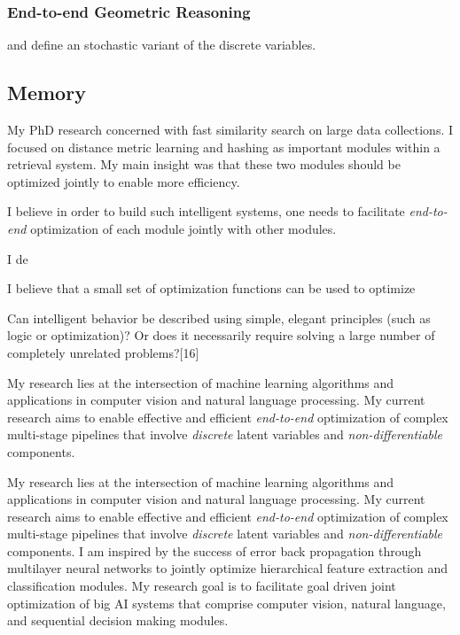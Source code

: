\documentclass[a4paper, 10pt]{article}
\begin{document}
\subsubsection*{End-to-end Geometric Reasoning}


and define an stochastic variant of the
discrete variables.

\subsection{Memory}

My PhD research concerned with fast similarity search on large data
collections. I focused on distance metric learning and hashing as
important modules within a retrieval system. My main insight was that
these two modules should be optimized jointly to enable more efficiency.


I believe in order to build such intelligent systems,
one needs to facilitate {\em end-to-end} optimization of each module
jointly with other modules.



I de

I believe that a small
set of optimization functions can be used to optimize 


Can intelligent behavior be described using simple, elegant principles
(such as logic or optimization)? Or does it necessarily require
solving a large number of completely unrelated problems?[16]



My research lies at the intersection of machine learning algorithms
and applications in computer vision and natural language processing.
My current research aims to enable effective and efficient {\em
  end-to-end} optimization of complex multi-stage pipelines that
involve {\em discrete} latent variables and {\em non-differentiable}
components. 


My research lies at the intersection of machine learning algorithms
and applications in computer vision and natural language processing.
My current research aims to enable effective and efficient {\em
  end-to-end} optimization of complex multi-stage pipelines that
involve {\em discrete} latent variables and {\em non-differentiable}
components.  I am inspired by the success of error back propagation
through multilayer neural networks to jointly optimize hierarchical
feature extraction and classification modules. My research goal is to
facilitate goal driven joint optimization of big AI systems that
comprise computer vision, natural language, and sequential decision
making modules.
\end{document}
